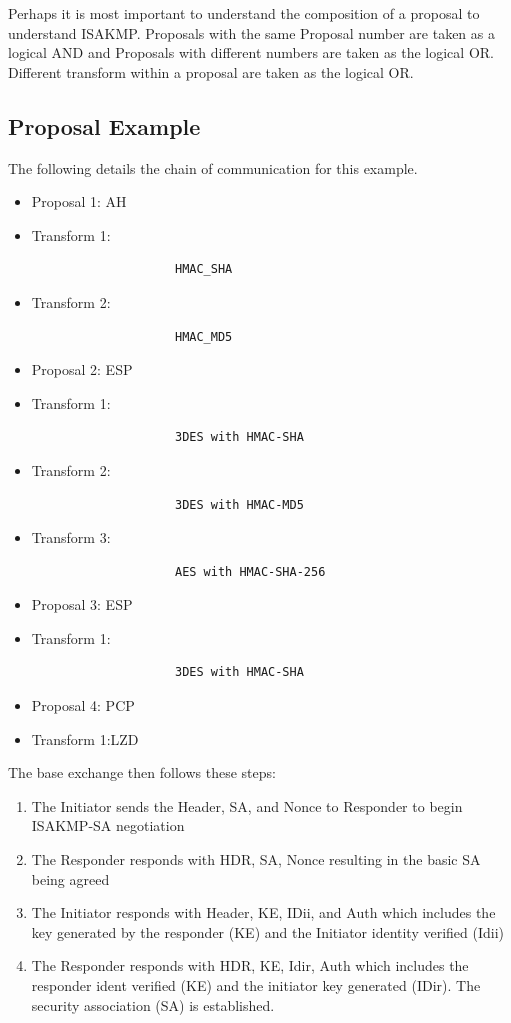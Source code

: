 \documentclass{article}
\begin{document}
Perhaps it is most important to understand the composition of a proposal to understand ISAKMP. Proposals with the same Proposal number are taken as a logical AND and Proposals with different numbers are taken as the logical OR. Different transform within a proposal are taken as the logical OR. 

\subsection {Proposal Example}

The following details the chain of communication for this example. 

\begin{itemize}
\squash
\item Proposal 1: AH
\item Transform 1: \begin{verbatim}
					HMAC_SHA
					\end{verbatim}	 
\item Transform 2: \begin{verbatim}
					HMAC_MD5
					\end{verbatim}
\item Proposal 2: ESP
\item Transform 1: \begin{verbatim}
					3DES with HMAC-SHA
					\end{verbatim}
\item Transform 2: \begin{verbatim}
					3DES with HMAC-MD5
					\end{verbatim}
\item Transform 3: \begin{verbatim}
					AES with HMAC-SHA-256
					\end{verbatim}
\item Proposal 3: ESP
\item Transform 1: \begin{verbatim}
					3DES with HMAC-SHA
					\end{verbatim}
\item Proposal 4: PCP
\item Transform 1:LZD
\end{itemize}


The base exchange then follows these steps:

\begin{enumerate}
\squash
\item The Initiator sends the Header, SA, and Nonce to Responder to begin ISAKMP-SA negotiation
\item The Responder responds with HDR, SA, Nonce resulting in the basic SA being agreed 
\item The Initiator responds with Header, KE, IDii, and Auth which includes the key generated by the responder (KE) and the Initiator identity verified (Idii)
\item The Responder responds with HDR, KE, Idir, Auth which includes the responder ident verified (KE) and the initiator key generated (IDir). The security association (SA) is established. 
\end{enumerate}
\end{document}
